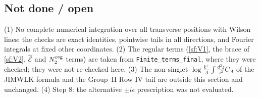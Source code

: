 \subsection{Not done / open}
\noindent (1) No complete numerical integration over all transverse positions with Wilson lines: the checks are exact identities, pointwise tails in all directions, and Fourier integrals at fixed other coordinates. (2) The regular terms (\eqref{sf:V1}, the brace of \eqref{sf:V2}, $\widehat{\mathcal{E}}$ and $N_{2}^{\rm reg}$ terms) are taken from \texttt{Finite\_terms\_final}, where they were checked; they were not re-checked here. (3) The non-singlet $\log\frac{k^{+}}{\Lambda}\int\frac{d^{2}z}{z^{2}}C_{A}$ of the JIMWLK formula and the Group~II Row IV tail are outside this section and unchanged. (4) Step 8: the alternative $\pm i\epsilon$ prescription was not evaluated.
